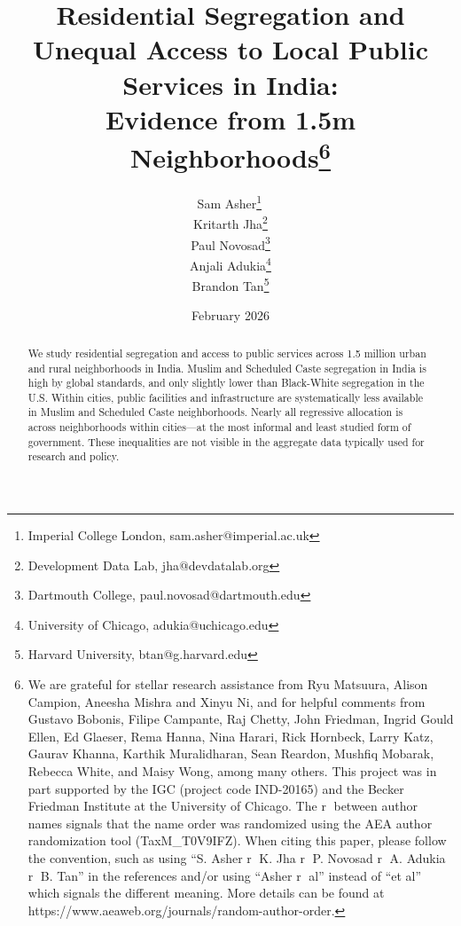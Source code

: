 \documentclass[12pt]{article}
\newcommand*\circled[1]{\tikz[baseline=(char.base)]{
            \node[shape=circle,draw,inner sep=1pt,font=\tiny] (char) {#1};}}
\begin{document}
\begin{titlepage}
  \title{Residential Segregation and \\ Unequal Access to Local Public Services in India: \\ Evidence from 1.5m Neighborhoods\footnote{We are grateful for stellar research assistance from Ryu Matsuura, Alison Campion, Aneesha Mishra and Xinyu Ni, and for helpful comments from Gustavo Bobonis, Filipe Campante, Raj Chetty, John Friedman, Ingrid Gould Ellen, Ed Glaeser, Rema Hanna, Nina Harari, Rick Hornbeck, Larry Katz, Gaurav Khanna, Karthik Muralidharan, Sean Reardon, Mushfiq Mobarak, Rebecca White, and Maisy Wong, among many others. This project was in part supported by the IGC (project code IND-20165) and the Becker Friedman Institute at the University of Chicago. The \textcircled{r} between author names signals that the name order was randomized using the AEA author randomization tool (TaxM\_T0V9IFZ). When citing this paper, please follow the convention, such as using ``S. Asher \textcircled{r} K. Jha \textcircled{r} P. Novosad \textcircled{r} A. Adukia \textcircled{r} B. Tan'' in the references and/or using ``Asher \textcircled{r} al'' instead of ``et al'' which signals the different meaning. More details can be found at https://www.aeaweb.org/journals/random-author-order.}}
  \author{Sam Asher\thanks{Imperial College London,
      sam.asher@imperial.ac.uk}\, \superscript{\circled{r}} \\ Kritarth Jha\thanks{Development Data Lab,
      jha@devdatalab.org}\; \superscript{\circled{r}} \\ Paul Novosad\thanks{Dartmouth College, paul.novosad@dartmouth.edu}\; \superscript{\circled{r}} \\ Anjali Adukia\thanks{University of Chicago,
      adukia@uchicago.edu}\;  \superscript{\circled{r}} \\ Brandon Tan\thanks{Harvard University, btan@g.harvard.edu}\; \superscript{\circled{r}}}

  \date{February 2026}
  \maketitle
  \begin{abstract}

    We study residential segregation and access to public services across 1.5 million urban and rural neighborhoods in India. Muslim and Scheduled Caste segregation in India is high by global standards, and only slightly lower than Black-White segregation in the U.S. Within cities, public facilities and infrastructure are systematically less available in Muslim and Scheduled Caste neighborhoods. Nearly all regressive allocation is across neighborhoods within cities---at the most informal and least studied form of government. These inequalities are not visible in the aggregate data typically used for research and policy.


\end{abstract}
\end{titlepage}
\end{document}

